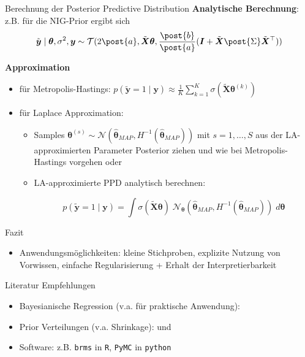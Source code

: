 \documentclass[
  ignorenonframetext,
  aspectratio=169,
]{beamer}
\providecommand{\tightlist}{%
  \setlength{\itemsep}{0pt}\setlength{\parskip}{0pt}}
\newcommand{\by}{\bm{y}}
\newcommand{\bI}{\bm{I}}
\newcommand{\Ncal}{\mathcal{N}}
\newcommand{\Tcal}{\mathcal{T}}
\newcommand{\ssd}{\sigma^2}
\newcommand{\btheta}{\bm{\theta}}
\newcommand{\hbtheta}{\hat{\bm{\theta}}}
\newcommand{\Sdpo}{\post{\Sigma}}
\newcommand{\apo}{\post{a}}
\newcommand{\bpo}{\post{b}}
\newcommand{\ty}{\tilde{\bm{y}}}
\newcommand{\tX}{\tilde{\bm{X}}}
\begin{document}
\begin{frame}{Berechnung der Posterior Predictive Distribution}
\protect{}\label{berechnung-der-posterior-predictive-distribution}
\textbf{Analytische Berechnung}: z.B. für die NIG-Prior ergibt sich
\[\ty \mid \btheta, \ssd, \by \sim \Tcal(2 \apo, \tX \btheta, \frac{\bpo}{\apo} (\bI + \tX \Sdpo \tX^\top))\]

\textbf{Approximation}

\begin{itemize}
\tightlist
\item
  für Metropolis-Hastings:
  \(p(\ty = 1 \mid \by) \approx \frac{1}{K} \sum_{k=1}^{K} \sigma(\tX \btheta^{(k)})\)
\item
  für Laplace Approximation:

  \begin{itemize}
  \item
    Samples
    \(\btheta^{(s)} \sim \Ncal(\hbtheta_{MAP}, H^{-1}(\hbtheta_{MAP}))\)
    mit \(s = 1, \dots, S\) aus der LA-approximierten Parameter
    Posterior ziehen und wie bei Metropolis-Hastings vorgehen oder
  \item
    LA-approximierte PPD analytisch berechnen:

    \[p(\ty = 1 \mid \by) = \int \sigma(\tX \btheta) \; \Ncal_{\btheta}(\hbtheta_{MAP}, H^{-1} (\hbtheta_{MAP})) \; d \btheta\]
  \end{itemize}
\end{itemize}
\end{frame}

\begin{frame}[fragile]
\begin{block}{Fazit}
\protect{}\label{fazit}
\begin{itemize}
\tightlist
\item
  Anwendungsmöglichkeiten: kleine Stichproben, explizite Nutzung von
  Vorwissen, einfache Regularisierung + Erhalt der Interpretierbarkeit
\end{itemize}
\end{block}

\begin{block}{Literatur Empfehlungen}
\protect{}\label{literatur-empfehlungen}
\begin{itemize}
\tightlist
\item
  Bayesianische Regression (v.a. für praktische Anwendung):
  \textcite{gelman_bayesian_2013}
\item
  Prior Verteilungen (v.a. Shrinkage): \textcite{van_erp_shrinkage_2019}
  und \textcite{celeux_regularization_2012}
\item
  Software: z.B. \texttt{brms} in \texttt{R}, \texttt{PyMC} in
  \texttt{python}
\end{itemize}
\end{block}
\end{frame}
\end{document}
